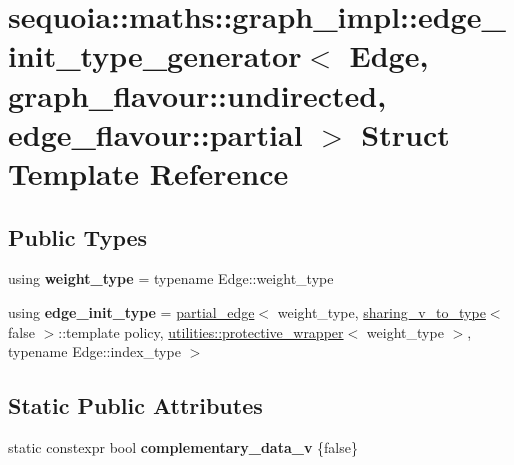 \hypertarget{structsequoia_1_1maths_1_1graph__impl_1_1edge__init__type__generator_3_01_edge_00_01graph__flavoe0b6797a51a27c44b843b57cf3be639f}{}\section{sequoia\+::maths\+::graph\+\_\+impl\+::edge\+\_\+init\+\_\+type\+\_\+generator$<$ Edge, graph\+\_\+flavour\+::undirected, edge\+\_\+flavour\+::partial $>$ Struct Template Reference}
\label{structsequoia_1_1maths_1_1graph__impl_1_1edge__init__type__generator_3_01_edge_00_01graph__flavoe0b6797a51a27c44b843b57cf3be639f}
\subsection*{Public Types}
\begin{DoxyCompactItemize}
\item 
\mbox{\label{structsequoia_1_1maths_1_1graph__impl_1_1edge__init__type__generator_3_01_edge_00_01graph__flavoe0b6797a51a27c44b843b57cf3be639f_ac41e8231307cbaff137b0546302fd89f}} 
using {\bfseries weight\+\_\+type} = typename Edge\+::weight\+\_\+type
\item 
\mbox{\label{structsequoia_1_1maths_1_1graph__impl_1_1edge__init__type__generator_3_01_edge_00_01graph__flavoe0b6797a51a27c44b843b57cf3be639f_a3fed36eec36c598f91441781824caf4e}} 
using {\bfseries edge\+\_\+init\+\_\+type} = \mbox{\hyperlink{classsequoia_1_1maths_1_1partial__edge}{partial\+\_\+edge}}$<$ weight\+\_\+type, \mbox{\hyperlink{structsequoia_1_1maths_1_1graph__impl_1_1sharing__v__to__type}{sharing\+\_\+v\+\_\+to\+\_\+type}}$<$ false $>$\+::template policy, \mbox{\hyperlink{classsequoia_1_1utilities_1_1protective__wrapper}{utilities\+::protective\+\_\+wrapper}}$<$ weight\+\_\+type $>$, typename Edge\+::index\+\_\+type $>$
\end{DoxyCompactItemize}
\subsection*{Static Public Attributes}
\begin{DoxyCompactItemize}
\item 
\mbox{\label{structsequoia_1_1maths_1_1graph__impl_1_1edge__init__type__generator_3_01_edge_00_01graph__flavoe0b6797a51a27c44b843b57cf3be639f_a144787243660d58763e52f5fda5fc7e1}} 
static constexpr bool {\bfseries complementary\+\_\+data\+\_\+v} \{false\}
\end{DoxyCompactItemize}


